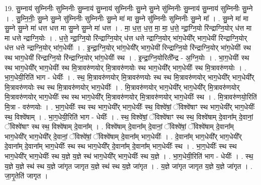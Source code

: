 \documentclass[17pt]{extarticle}
\begin{document}
19. सु॒म्नाय॑ सुम्निनीः सुम्निनीः सु॒म्नाय॑ सु॒म्नाय॑ सुम्निनीः सु॒म्ने सु॒म्ने सु॑म्निनीः सु॒म्नाय॑ सु॒म्नाय॑ सुम्निनीः सु॒म्ने । . सु॒म्नि॒नीः॒ सु॒म्ने सु॒म्ने सु॑म्निनीः सुम्निनीः सु॒म्ने मा॑ मा सु॒म्ने सु॑म्निनीः सुम्निनीः सु॒म्ने मा᳚ । . सु॒म्ने मा॑ मा सु॒म्ने सु॒म्ने मा॑ धत्त धत्त मा सु॒म्ने सु॒म्ने मा॑ धत्त । . मा॒ ध॒त्त॒ ध॒त्त॒ मा॒ मा॒ ध॒त्ते॒ न्द्रा॒ग्नि॒यो रि॑न्द्राग्नि॒योर् ध॑त्त मा मा धत्ते न्द्राग्नि॒योः । . ध॒त्ते॒ न्द्रा॒ग्नि॒यो रि॑न्द्राग्नि॒योर् ध॑त्त धत्ते न्द्राग्नि॒योर् भा॑ग॒धेयी᳚र् भाग॒धेयी॑ रिन्द्राग्नि॒योर् ध॑त्त धत्ते न्द्राग्नि॒योर् भा॑ग॒धेयीः᳚ । . इ॒न्द्रा॒ग्नि॒योर् भा॑ग॒धेयी᳚र् भाग॒धेयी॑ रिन्द्राग्नि॒यो रि॑न्द्राग्नि॒योर् भा॑ग॒धेयीः᳚ स्थ स्थ भाग॒धेयी॑ रिन्द्राग्नि॒यो रि॑न्द्राग्नि॒योर् भा॑ग॒धेयीः᳚ स्थ । . इ॒न्द्रा॒ग्नि॒योरिती᳚न्द्र - अ॒ग्नि॒योः । . भा॒ग॒धेयीः᳚ स्थ स्थ भाग॒धेयी᳚र् भाग॒धेयीः᳚ स्थ मि॒त्रावरु॑णयोर् मि॒त्रावरु॑णयोः स्थ भाग॒धेयी᳚र् भाग॒धेयीः᳚ स्थ मि॒त्रावरु॑णयोः । . भा॒ग॒धेयी॒रिति॑ भाग - धेयीः᳚ । . स्थ॒ मि॒त्रावरु॑णयोर् मि॒त्रावरु॑णयोः स्थ स्थ मि॒त्रावरु॑णयोर् भाग॒धेयी᳚र् भाग॒धेयी᳚र् मि॒त्रावरु॑णयोः स्थ स्थ मि॒त्रावरु॑णयोर् भाग॒धेयीः᳚ । . मि॒त्रावरु॑णयोर् भाग॒धेयी᳚र् भाग॒धेयी᳚र् मि॒त्रावरु॑णयोर् मि॒त्रावरु॑णयोर् भाग॒धेयीः᳚ स्थ स्थ भाग॒धेयी᳚र् मि॒त्रावरु॑णयोर् मि॒त्रावरु॑णयोर् भाग॒धेयीः᳚ स्थ । . मि॒त्रावरु॑णयो॒रिति॑ मि॒त्रा - वरु॑णयोः । . भा॒ग॒धेयीः᳚ स्थ स्थ भाग॒धेयी᳚र् भाग॒धेयीः᳚ स्थ॒ विश्वे॑षां॒ ॅविश्वे॑षाꣳ स्थ भाग॒धेयी᳚र् भाग॒धेयीः᳚ स्थ॒ विश्वे॑षाम् । . भा॒ग॒धेयी॒रिति॑ भाग - धेयीः᳚ । . स्थ॒ विश्वे॑षां॒ ॅविश्वे॑षाꣳ स्थ स्थ॒ विश्वे॑षाम् दे॒वाना᳚म् दे॒वानां॒ ॅविश्वे॑षाꣳ स्थ स्थ॒ विश्वे॑षाम् दे॒वाना᳚म् । . विश्वे॑षाम् दे॒वाना᳚म् दे॒वानां॒ ॅविश्वे॑षां॒ ॅविश्वे॑षाम् दे॒वाना᳚म् भाग॒धेयी᳚र् भाग॒धेयी᳚र् दे॒वानां॒ ॅविश्वे॑षां॒ ॅविश्वे॑षाम् दे॒वाना᳚म् भाग॒धेयीः᳚ । . दे॒वाना᳚म् भाग॒धेयी᳚र् भाग॒धेयी᳚र् दे॒वाना᳚म् दे॒वाना᳚म् भाग॒धेयीः᳚ स्थ स्थ भाग॒धेयी᳚र् दे॒वाना᳚म् दे॒वाना᳚म् भाग॒धेयीः᳚ स्थ । . भा॒ग॒धेयीः᳚ स्थ स्थ भाग॒धेयी᳚र् भाग॒धेयीः᳚ स्थ य॒ज्ञे य॒ज्ञे स्थ॑ भाग॒धेयी᳚र् भाग॒धेयीः᳚ स्थ य॒ज्ञे । . भा॒ग॒धेयी॒रिति॑ भाग - धेयीः᳚ । . स्थ॒ य॒ज्ञे य॒ज्ञे स्थ॑ स्थ य॒ज्ञे जा॑गृत जागृत य॒ज्ञे स्थ॑ स्थ य॒ज्ञे जा॑गृत । . य॒ज्ञे जा॑गृत जागृत य॒ज्ञे य॒ज्ञे जा॑गृत । . जा॒गृ॒तेति॑ जागृत । \newline
\pagebreak
{}
\end{document}

